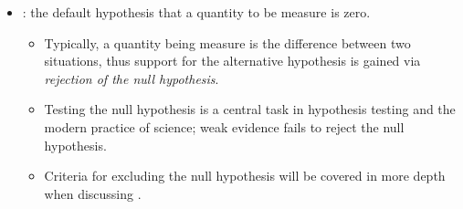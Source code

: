 \begin{itemize}
\begin{itemize}
      \item A \emph{strong hypothesis} is:
      \begin{multicols}{2}
        \begin{itemize}
          \item \emph{Falsifiable}---ideally testable, makes a criticizable prediction. 
          \item \emph{Parsimonious}---limits excessive entities; application of ``Occam's razor.''
          \item \emph{Scoped}---clear, specific, applicable; a statement, not a question.
          \item \emph{Fruitful}---may explain further phenomena, aids in understanding.
        \end{itemize}
      \end{multicols}
    \end{itemize}

  \item {}: the default hypothesis that a quantity to be measure is zero. 
    \begin{itemize}
      \item Typically, a quantity being measure is the difference between two situations, thus support for the alternative hypothesis is gained via \emph{rejection of the null hypothesis}.
      \item Testing the null hypothesis is a central task in hypothesis testing and the modern practice of science; weak evidence fails to reject the null hypothesis.
      \item Criteria for excluding the null hypothesis will be covered in more depth when discussing \hyperref[Chapter: Confidence Intervals]{}.
    \end{itemize}
  

\end{itemize}

